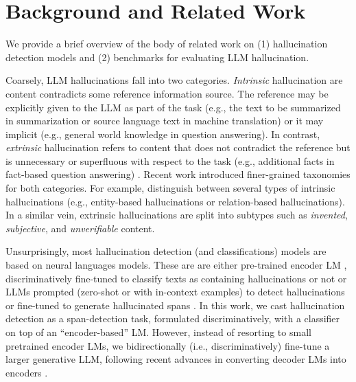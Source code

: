 \section{Background and Related Work}

We provide a brief overview of the body of related work on (1) hallucination detection models and (2) benchmarks for evaluating LLM hallucination. 


%
Coarsely, LLM hallucinations fall into two categories. \textit{Intrinsic} hallucination are content contradicts some reference information source. The reference may be explicitly given to the LLM as part of the task (e.g., the text to be summarized in summarization or source language text in machine translation) or it may implicit (e.g., general world knowledge in question answering). In contrast, \textit{extrinsic} hallucination refers to content that does not contradict the reference but is unnecessary or superfluous with respect to the task (e.g., additional facts in fact-based question answering) \citep{ji2023survey}. Recent work introduced finer-grained taxonomies for both categories. For example, \citet{mishra2024finegrained} distinguish between several types of intrinsic hallucinations (e.g., entity-based hallucinations or relation-based hallucinations). In a similar vein, extrinsic hallucinations are split into subtypes such as \textit{invented}, \textit{subjective}, and \textit{unverifiable} content. 

Unsurprisingly, most hallucination detection (and classifications) models are based on neural languages models. These are are either pre-trained encoder LM \citep{zhou2021detecting,liu-etal-2022-multi}, discriminatively fine-tuned to classify texts as containing hallucinations or not or LLMs prompted (zero-shot or with in-context examples) to detect hallucinations \citep{manakul-etal-2023-selfcheckgpt, yang2023new} or fine-tuned to generate hallucinated spans \citep{mishra2024finegrained}. 
In this work, we cast hallucination detection as a span-detection task, formulated discriminatively, with a classifier on top of an ``encoder-based'' LM. However, instead of resorting to small pretrained encoder LMs, we bidirectionally (i.e., discriminatively) fine-tune a larger generative LLM, following recent advances in converting decoder LMs into encoders \cite{li2023label, Dukic2024LookingRI, behnamghader2024llmvec, schmidt-etal-2024-self}.     

